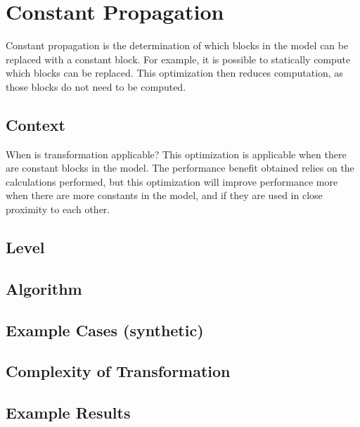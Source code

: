 \section{Constant Propagation}

Constant propagation is the determination of which blocks in the model can be replaced with a constant block. For example, it is possible to statically compute which blocks can be replaced. This optimization then reduces computation, as those blocks do not need to be computed.

\subsection{Context}
When is transformation applicable?
This optimization is applicable when there are constant blocks in the model. The performance benefit obtained relies on the calculations performed, but this optimization will improve performance more when there are more constants in the model, and if they are used in close proximity to each other.


\subsection{Level}

\subsection{Algorithm}

\subsection{Example Cases (synthetic)}

\subsection{Complexity of Transformation}

\subsection{Example Results}
